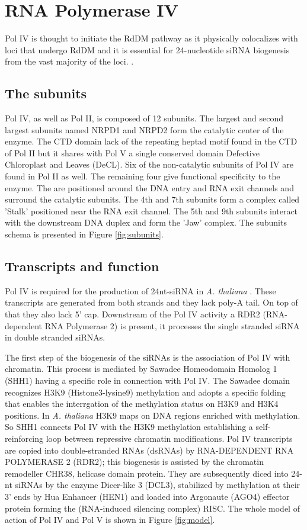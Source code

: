 \documentclass[a4paper, twocolumn]{article}
\begin{document}
\section{RNA Polymerase IV}
Pol IV is thought to initiate the RdDM pathway as it physically colocalizes with loci that undergo RdDM and it is essential for 24-nucleotide siRNA biogenesis from the
vast majority of the loci. \cite{Pontes2006}. 

\subsection{The subunits}
Pol IV, as well as Pol II, is composed of 12 subunits. The largest and second largest subunits named NRPD1  and NRPD2 form the catalytic center of the enzyme. The CTD domain lack of the repeating heptad motif found in the CTD of Pol II but it shares with Pol V a single conserved domain Defective Chloroplast and Leaves (DeCL). 
Six of the non-catalytic subunits of Pol IV are found in Pol II as well. The remaining four give functional specificity to the enzyme. The are positioned around the DNA entry and RNA exit channels and surround the catalytic subunits. The 4th and 7th subunits form a complex called 'Stalk' positioned near the RNA exit channel. The 5th and 9th subunits interact with the downstream DNA duplex and form the 'Jaw' complex. The subunits schema is presented in Figure \ref{fig:subunits}.

\subsection{Transcripts and function}
Pol IV is required for the production of 24nt-siRNA in \textit{A. thaliana}  \cite{Zhang130}. These transcripts are generated from both strands and they lack poly-A tail. On top of that they also lack 5' cap. Downstream of the Pol IV activity a RDR2 (RNA-dependent RNA Polymerase 2) is present, it processes the single stranded siRNA in double stranded siRNAs. 

The first step of the biogenesis of the siRNAs is the association of Pol IV with chromatin. This process is mediated by Sawadee Homeodomain Homolog 1 (SHH1) \cite{LAW2013} having a specific role in connection with Pol IV. The Sawadee domain recognizes H3K9 (Histone3-lysine9) methylation and adopts a specific folding that enables the interrgation of the methylation status on H3K9 and H3K4 positions. In \textit{A. thaliana} H3K9 maps on DNA regions enriched with methylation. So SHH1 connects Pol IV with the H3K9 methylation establishing a self-reinforcing loop between repressive chromatin modifications. 
Pol IV transcripts are copied into double-stranded RNAs (dsRNAs) by RNA-DEPENDENT RNA POLYMERASE 2 (RDR2); this biogenesis is assisted by the chromatin remodeller CHR38, helicase domain protein. They are subsequently diced into 24-nt siRNAs by the enzyme Dicer-like 3 (DCL3), stabilized by methylation at their 3' ends by Hua Enhancer (HEN1) and loaded into Argonaute (AGO4) effector protein forming the (RNA-induced silencing complex) RISC. 
The whole model of action of Pol IV and Pol V is shown in Figure \ref{fig:model}.
\end{document}

